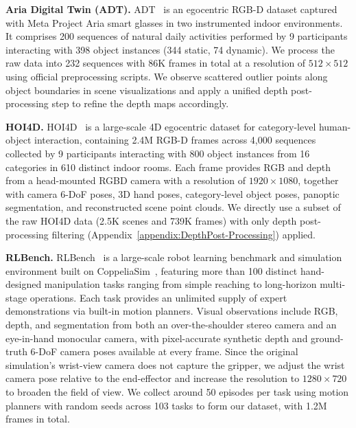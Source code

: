 \textbf{Aria Digital Twin (ADT).}
ADT~\citep{pan2023aria} is an egocentric RGB-D dataset captured with Meta Project Aria smart glasses in two instrumented indoor environments.
%
It comprises 200 sequences of natural daily activities performed by 9 participants interacting with 398 object instances (344 static, 74 dynamic). 
%
We process the raw data into 232 sequences with 86K frames in total at a resolution of $512 \times 512$ using official preprocessing scripts. 
%
We observe scattered outlier points along object boundaries in scene visualizations and apply a unified depth post-processing step to refine the depth maps accordingly.


\textbf{HOI4D.}
HOI4D~\citep{liu2022hoi4d} is a large-scale 4D egocentric dataset for category-level human-object interaction, containing 2.4M RGB-D frames across 4,000 sequences collected by 9 participants interacting with 800 object instances from 16 categories in 610 distinct indoor rooms.
%
Each frame provides RGB and depth from a head-mounted RGBD camera with a resolution of $1920 \times 1080$, together with camera 6-DoF poses, 3D hand poses, category-level object poses, panoptic segmentation, and reconstructed scene point clouds.
%
We directly use a subset of the raw HOI4D data (2.5K scenes and 739K frames) with only depth post-processing filtering (Appendix~\ref{appendix:DepthPost-Processing}) applied.



\textbf{RLBench.}
RLBench~\citep{james2020rlbench} is a large-scale robot learning benchmark and simulation environment built on CoppeliaSim~\citep{rohmer2013CoppeliaSim}, featuring more than 100 distinct hand-designed manipulation tasks ranging from simple reaching to long-horizon multi-stage operations.
%
Each task provides an unlimited supply of expert demonstrations via built-in motion planners. 
%
Visual observations include RGB, depth, and segmentation from both an over-the-shoulder stereo camera and an eye-in-hand monocular camera, with pixel-accurate synthetic depth and ground-truth 6-DoF camera poses available at every frame.
%
Since the original simulation's wrist-view camera does not capture the gripper, we adjust the wrist camera pose relative to the end-effector and increase the resolution to $1280 \times 720$ to broaden the field of view.
%
We collect around 50 episodes per task using motion planners with random seeds across 103 tasks to form our dataset, with 1.2M frames in total.


